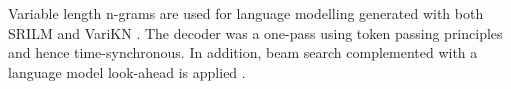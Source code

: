 \documentclass[b5paper]{article}
\begin{document}
Variable length n-grams are used for language modelling generated with both SRILM \cite{stolcke2002srilm} and VariKN \cite{siivola2007growing,siivola2007morfessor}. The decoder was a one-pass using token passing principles and hence time-synchronous. In addition, beam search complemented with a language model look-ahead is applied \cite{ortmanns1997look}.

%
%
%
%
%
%
%
\end{document}
